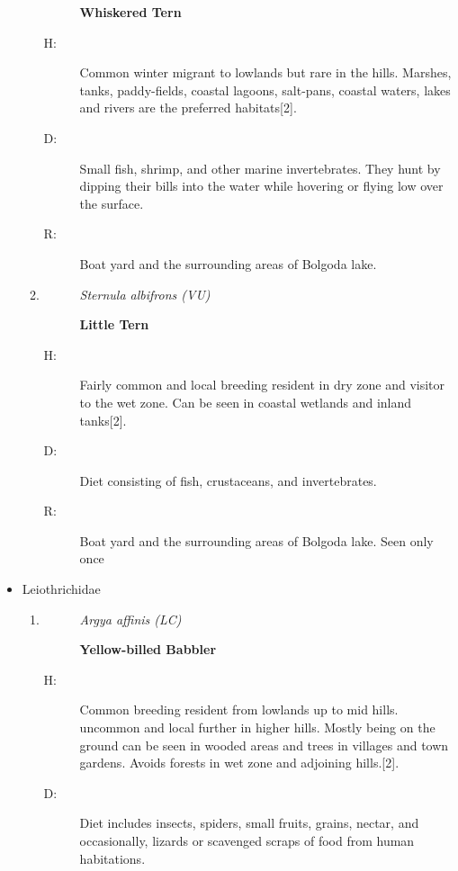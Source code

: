 \begin{itemize}
\begin{enumerate}
\begin{description}
\item[]%
\textbf{Whiskered Tern}%
\end{description}%
\begin{description}%
\item[H: ]%
Common winter migrant to lowlands but rare in the hills. Marshes, tanks, paddy-fields, coastal lagoons, salt{-}pans, coastal waters, lakes and rivers are the preferred habitats{[}2{]}.%
\item[D: ]%
Small fish, shrimp, and other marine invertebrates. They hunt by dipping their bills into the water while hovering or flying low over the surface.%
\item[R: ]%
Boat yard and the surrounding areas of Bolgoda lake.%
\end{description}%
\item%
\begin{description}%
\item[]%
\textit{Sternula albifrons (VU)}%
\item[]%
\textbf{Little Tern}%
\end{description}%
\begin{description}%
\item[H: ]%
Fairly common and local breeding resident in dry zone and visitor to the wet zone. Can be seen in coastal wetlands and inland tanks{[}2{]}.%
\item[D: ]%
Diet consisting of fish, crustaceans, and invertebrates.%
\item[R: ]%
Boat yard and the surrounding areas of Bolgoda lake. Seen only once%
\end{description}%
\end{enumerate}%
\item%
Leiothrichidae%
\begin{enumerate}%
\item%
\begin{description}%
\item[]%
\textit{Argya affinis (LC)}%
\item[]%
\textbf{Yellow{-}billed Babbler}%
\end{description}%
\begin{description}%
\item[H: ]%
Common breeding resident from lowlands up to mid hills. uncommon and local further in higher hills. Mostly being on the ground can be seen in wooded areas and trees in villages and town gardens. Avoids forests in wet zone and adjoining hills.{[}2{]}.%
\item[D: ]%
Diet includes insects, spiders, small fruits, grains, nectar, and occasionally, lizards or scavenged scraps of food from human habitations.%

\end{description}
\end{enumerate}
\end{itemize}
